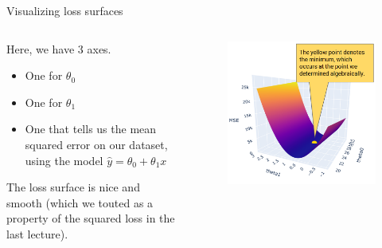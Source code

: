\documentclass[aspectratio=169]{../latex_main/tntbeamer}  %
\begin{document}
	
	\begin{frame}{Visualizing loss surfaces}
	    \begin{columns}
	        \begin{column}{.5\textwidth}
	                Here, we have 3 axes.
	                \begin{itemize}
	                    \item One for   $\theta_0$ 
	                    \item One for      $\theta_1$ 
	                    \item One that tells us the mean squared error on our dataset, using the model    $\hat{y} = \theta_0 + \theta_1x$                           
	                \end{itemize}
	                The loss surface is nice and smooth (which we touted as a property of the squared loss in the last lecture).\\

	        \end{column}
	        
	        \begin{column}{.5\textwidth}
	               \begin{figure}
	                   \includegraphics[scale=.3]{Bild6}
	               \end{figure}

	        \end{column}
	    \end{columns}
	\end{frame}
\end{document}
